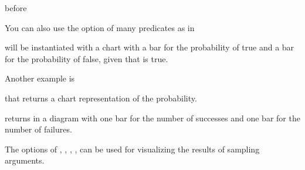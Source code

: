 \documentclass[letterpaper,10pt,english]{sphinxmanual}
\begin{document}
\sphinxAtStartPar
before 

\sphinxAtStartPar
You can also use the  option of many predicates as in

\begin{sphinxVerbatim}[commandchars=\\\{\}]
 \PYG{p}{[}\PYG{p}{]}
\end{sphinxVerbatim}

\sphinxAtStartPar
{} will be instantiated with a chart with a bar for the probability of  true and a bar for the probability of  false, given that  is true.

\sphinxAtStartPar
Another example is

\begin{sphinxVerbatim}[commandchars=\\\{\}]
 \PYG{p}{[}\PYG{p}{]}
\end{sphinxVerbatim}

\sphinxAtStartPar
that returns a chart representation of the probability.

\begin{sphinxVerbatim}[commandchars=\\\{\}]
 \PYG{p}{[}\PYG{p}{]}
\end{sphinxVerbatim}

\sphinxAtStartPar
returns in  a diagram with one bar for the number of successes and one bar for the number of failures.

\sphinxAtStartPar
The options of , , , , can be used for visualizing the results of sampling arguments.
\end{document}
